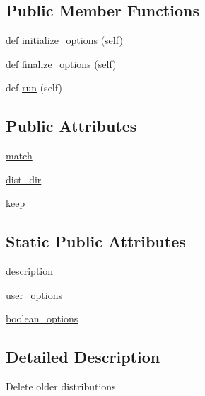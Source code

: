 \subsection*{Public Member Functions}
\begin{DoxyCompactItemize}
\item 
def \hyperlink{classsetuptools_1_1command_1_1rotate_1_1rotate_a5ec8c4fb43507418406dabbc1ccba524}{initialize\+\_\+options} (self)
\item 
def \hyperlink{classsetuptools_1_1command_1_1rotate_1_1rotate_a79937f11c485822401654095958261ab}{finalize\+\_\+options} (self)
\item 
def \hyperlink{classsetuptools_1_1command_1_1rotate_1_1rotate_ab616d54a363a536c0201b55dcc2b1110}{run} (self)
\end{DoxyCompactItemize}
\subsection*{Public Attributes}
\begin{DoxyCompactItemize}
\item 
\hyperlink{classsetuptools_1_1command_1_1rotate_1_1rotate_aad28873ea7841e9e3a363080894c3c31}{match}
\item 
\hyperlink{classsetuptools_1_1command_1_1rotate_1_1rotate_aca12ffc1c06ceed3253ca385f11d5e40}{dist\+\_\+dir}
\item 
\hyperlink{classsetuptools_1_1command_1_1rotate_1_1rotate_a5d5aeaa431c28bf2504ae02606f40342}{keep}
\end{DoxyCompactItemize}
\subsection*{Static Public Attributes}
\begin{DoxyCompactItemize}
\item 
\hyperlink{classsetuptools_1_1command_1_1rotate_1_1rotate_a1e07682d8a76bcca138af3fa098afa7d}{description}
\item 
\hyperlink{classsetuptools_1_1command_1_1rotate_1_1rotate_aa9debace43b98dc8851d0068c65bd6a0}{user\+\_\+options}
\item 
\hyperlink{classsetuptools_1_1command_1_1rotate_1_1rotate_a001fbaa281e6810cea8c704e947e1df0}{boolean\+\_\+options}
\end{DoxyCompactItemize}


\subsection{Detailed Description}
\begin{DoxyVerb}Delete older distributions\end{DoxyVerb}
 

